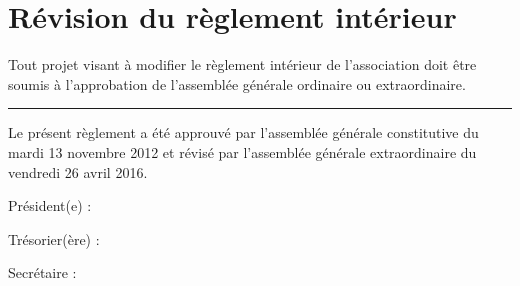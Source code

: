 \documentclass[a4paper, 11pt]{article}
\newcommand{\dateAGC}{mardi 13 novembre 2012}
\newcommand{\dateAGE}{vendredi 26 avril 2016}
\newcommand\sep{\noindent\rule{\linewidth}{.5pt}}
\begin{document}
\section{Révision du règlement intérieur} %

Tout projet visant à modifier le règlement intérieur de l'association doit être soumis à l'approbation de l'assemblée
générale ordinaire ou extraordinaire.

\bigskip\bigskip

\sep

\bigskip\bigskip

Le présent règlement a été approuvé par l'assemblée générale constitutive du \dateAGC{} et révisé par l'assemblée générale extraordinaire du \dateAGE{}.

\bigskip\bigskip

Président(e) :

\bigskip\bigskip

Trésorier(ère) :

\bigskip\bigskip

Secrétaire :
\end{document}
